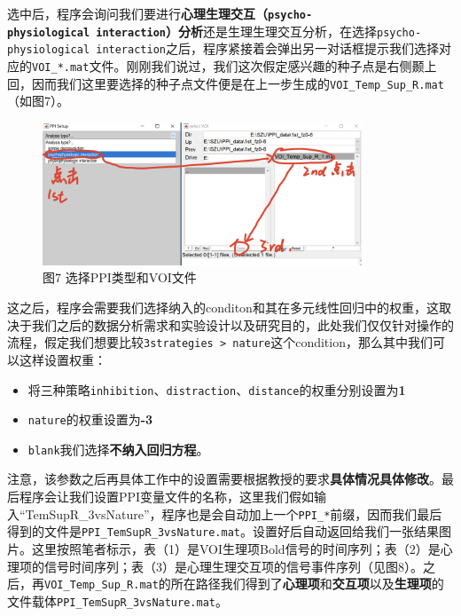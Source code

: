 \documentclass[
]{article}
\begin{document}
选中后，程序会询问我们要进行\textbf{心理生理交互（\texttt{psycho-physiological\ interaction}）分析}还是生理生理交互分析，在选择\texttt{psycho-physiological\ interaction}之后，程序紧接着会弹出另一对话框提示我们选择对应的\texttt{VOI\_*.mat}文件。刚刚我们说过，我们这次假定感兴趣的种子点是右侧颞上回，因而我们这里要选择的种子点文件便是在上一步生成的\texttt{VOI\_Temp\_Sup\_R.mat}（如图7）。

\begin{figure}
\centering
\includegraphics[width=3.75in,height=\textheight]{PPIs_step2.png}
\caption{图7 选择PPI类型和VOI文件}
\end{figure}

这之后，程序会需要我们选择纳入的conditon和其在多元线性回归中的权重，这取决于我们之后的数据分析需求和实验设计以及研究目的，此处我们仅仅针对操作的流程，假定我们想要比较\texttt{3strategies\ \textgreater{}\ nature}这个condition，那么其中我们可以这样设置权重：

\begin{itemize}
\item
  将三种策略\texttt{inhibition}、\texttt{distraction}、\texttt{distance}的权重分别设置为\textbf{1}
\item
  \texttt{nature}的权重设置为\textbf{-3}
\item
  \texttt{blank}我们选择\textbf{不纳入回归方程}。
\end{itemize}

注意，该参数之后再具体工作中的设置需要根据教授的要求\textbf{具体情况具体修改}。最后程序会让我们设置PPI变量文件的名称，这里我们假如输入``TemSupR\_3vsNature''，程序也是会自动加上一个\texttt{PPI\_*}前缀，因而我们最后得到的文件是\texttt{PPI\_TemSupR\_3vsNature.mat}。设置好后自动返回给我们一张结果图片。这里按照笔者标示，表（1）是VOI生理项Bold信号的时间序列；表（2）是心理项的信号时间序列；表（3）是心理生理交互项的信号事件序列（见图8）。之后，再\texttt{VOI\_Temp\_Sup\_R.mat}的所在路径我们得到了\textbf{心理项}和\textbf{交互项}以及\textbf{生理项}的文件载体\texttt{PPI\_TemSupR\_3vsNature.mat}。
\end{document}
